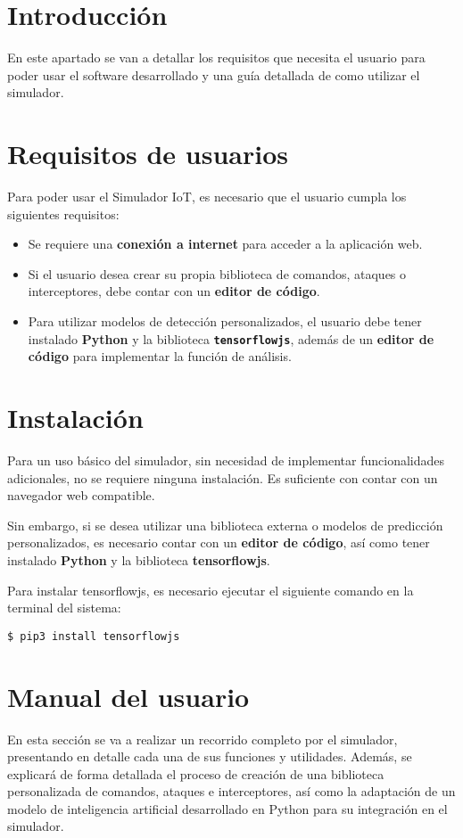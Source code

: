 
\section{Introducción}
\label{sec:UsuarioIntroduccion}
En este apartado se van a detallar los requisitos que necesita el usuario para poder usar el software desarrollado y una guía detallada de como utilizar el simulador.

\section{Requisitos de usuarios}
\label{sec:RequisitosUsuario}
Para poder usar el Simulador IoT, es necesario que el usuario cumpla los siguientes requisitos:
\begin{itemize}
    \item Se requiere una \textbf{conexión a internet} para acceder a la aplicación web.
    \item Si el usuario desea crear su propia biblioteca de comandos, ataques o interceptores, debe contar con un \textbf{editor de código}.
    \item Para utilizar modelos de detección personalizados, el usuario debe tener instalado \textbf{Python} y la biblioteca \textbf{\texttt{tensorflowjs}}, además de un \textbf{editor de código} para implementar la función de análisis.
\end{itemize}

\section{Instalación}
\label{sec:InstalacionUsuario}
Para un uso básico del simulador, sin necesidad de implementar funcionalidades adicionales, no se requiere ninguna instalación. Es suficiente con contar con un navegador web compatible.

Sin embargo, si se desea utilizar una biblioteca externa o modelos de predicción personalizados, es necesario contar con un \textbf{editor de código}, así como tener instalado \textbf{Python} y la biblioteca \textbf{tensorflowjs}.

Para instalar tensorflowjs, es necesario ejecutar el siguiente comando en la terminal del sistema:
\begin{verbatim}
$ pip3 install tensorflowjs
\end{verbatim}

\section{Manual del usuario}
\label{sec:ManualUsuario}
En esta sección se va a realizar un recorrido completo por el simulador, presentando en detalle cada una de sus funciones y utilidades. Además, se explicará de forma detallada el proceso de creación de una biblioteca personalizada de comandos, ataques e interceptores, así como la adaptación de un modelo de inteligencia artificial desarrollado en Python para su integración en el simulador.

